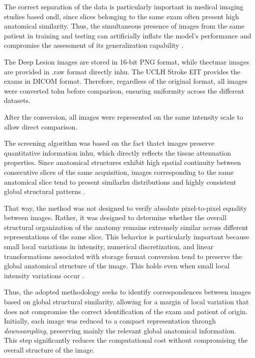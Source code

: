 The correct separation of the data is particularly important in medical imaging studies based on\acrshort{dl}, since slices belonging to the same exam often present high anatomical similarity. Thus, the simultaneous presence of images from the same patient in training and testing can artificially inflate the model's performance and compromise the assessment of its generalization capability \cite{onerTrainingMachineLearning2020}. 

The Deep Lesion images \cite{yanDeepLesionAutomatedMining2018} are stored in 16-bit PNG format, while the\acrshort{ctmar} images are provided in .raw format directly in\acrshort{hu}. The UCLH Stroke EIT \cite{gorenMultifrequencyElectricalImpedance2018} provides the exams in DICOM format. Therefore, regardless of the original format, all images were converted to\acrshort{hu} before comparison, ensuring uniformity across the different datasets.

After the conversion, all images were represented on the same intensity scale to allow direct comparison.

The screening algorithm was based on the fact that\acrshort{ct} images preserve quantitative information in\acrshort{hu}, which directly reflects the tissue attenuation properties. Since anatomical structures exhibit high spatial continuity between consecutive slices of the same acquisition, images corresponding to the same anatomical slice tend to present similar\acrshort{hu} distributions and highly consistent global structural patterns \cite{zhouwangImageQualityAssessment2004, hsiehComputedTomographyPrinciples2009}.   

That way, the method was not designed to verify absolute pixel-to-pixel equality between images. Rather, it was designed to determine whether the overall structural organization of the anatomy remains extremely similar across different representations of the same slice. This behavior is particularly important because small local variations in intensity, numerical discretization, and linear transformations associated with storage format conversion tend to preserve the global anatomical structure of the image. This holds even when small local intensity variations occur \cite{zhouwangImageQualityAssessment2004,hsiehComputedTomographyPrinciples2009}.

Thus, the adopted methodology seeks to identify correspondences between images based on global structural similarity, allowing for a margin of local variation that does not compromise the correct identification of the exam and patient of origin. Initially, each image was reduced to a compact representation through \textit{downsampling}, preserving mainly the relevant global anatomical information. This step significantly reduces the computational cost without compromising the overall structure of the image.

